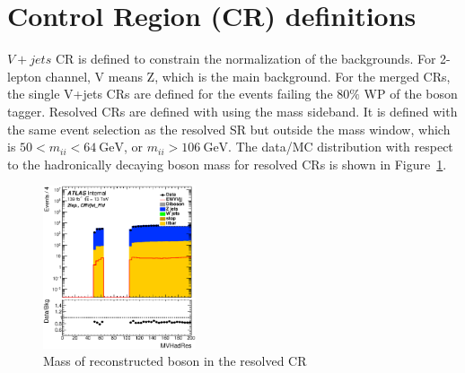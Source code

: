 \section{Control Region (CR) definitions}
$V+jets$ CR is defined to constrain the normalization of the backgrounds. For 2-lepton channel, V means Z, which is the main background.
For the merged CRs, the single V+jets CRs are defined for the events failing the 80$\%$ WP of the boson tagger. Resolved CRs are defined with using the mass sideband. It is defined with the same event selection as the resolved SR but outside the mass window, which is $50<m_{i i}<64 ~\mathrm{GeV}$, or $m_{i i}>106 ~\mathrm{GeV}$.
The data/MC distribution with respect to the hadronically decaying boson mass for resolved CRs is shown in Figure~\ref{fig:CRVjet}.
\begin{figure}[H]
    \centering
    \includegraphics[width=0.4\textwidth]{figures/2lep/dataMC/C_0ptag2pjet_0ptv_CRVjet_Fid_MVHadRes_Log}
    \caption{Mass of reconstructed boson in the resolved CR}
    \label{fig:CRVjet}
\end{figure}

